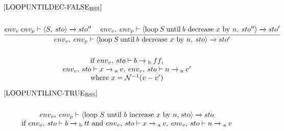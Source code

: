 \begin{equation}
\begin{split}
\begin{minipage}{\linewidth}
$[\text{LOOPUNTILDEC-FALSE}_\text{BSS}]$
\end{minipage}
\\\\
\begin{minipage}{\linewidth}
\centering
$\cfrac{env_v \: env_p \vdash \langle S, \: sto \rangle \xrightarrow{} sto'' \quad\: env_v, \: env_p \vdash \langle \text{loop} \: S \: \text{until} \: b \text{ decrease } x \text{ by } n, \: sto'' \rangle \xrightarrow{} sto'}{env_v, \: env_p \vdash \langle \text{loop} \: S \: \text{until} \: b \text{ decrease } x \text{ by } n, \: sto \rangle \xrightarrow{} sto'}$ 
\end{minipage}
\\\\
\begin{minipage}{\linewidth}
\centering
if $env_v, \: sto \vdash b \xrightarrow{}\textsubscript{b} \: ff,$ \\
$env_v, \: sto \vdash x \xrightarrow{}\textsubscript{a} \: v, \: env_v, \: sto \vdash n \xrightarrow{}\textsubscript{a} \: v'$ 
\\ where $x = \mathcal{N}^{-1}(v-v')$
\end{minipage}
\end{split}
\end{equation}


\begin{equation}
\begin{split}
\begin{minipage}{\linewidth}
$[\text{LOOPUNTILINC-TRUE}_\text{BSS}]$
\end{minipage}
\\\\
\begin{minipage}{\linewidth}
\centering
$env_v, \: env_p \vdash \langle $loop $S$ until $b$ increase $x$ by $n$, sto$\rangle \xrightarrow{} sto$ \\
if $env_v, \: sto \vdash b \xrightarrow{}\textsubscript{b} \: tt$ and $env_v, \: sto \vdash x \xrightarrow{}\textsubscript{a} \: v, \: env_v, \: sto \vdash n \xrightarrow{}\textsubscript{a} \: v$ 
\end{minipage}
\end{split}
\end{equation}

